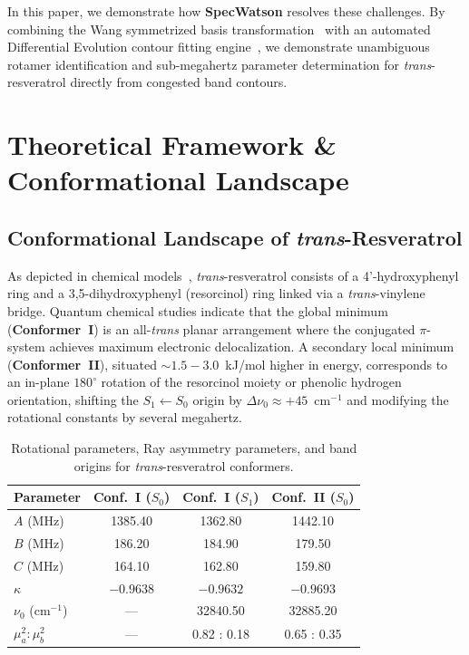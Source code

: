 \documentclass[aps,jcp,reprint,twocolumn,superscriptaddress,showpacs,amsmath,amssymb]{revtex4-2}
\begin{document}
In this paper, we demonstrate how \textbf{SpecWatson} resolves these challenges. By combining the Wang symmetrized basis transformation~\cite{wang1929degree} with an automated Differential Evolution contour fitting engine~\cite{storn1997differential}, we demonstrate unambiguous rotamer identification and sub-megahertz parameter determination for \textit{trans}-resveratrol directly from congested band contours.

\section{Theoretical Framework \& Conformational Landscape}

\subsection{Conformational Landscape of \textit{trans}-Resveratrol}
As depicted in chemical models~\cite{smeyers2004resveratrol}, \textit{trans}-resveratrol consists of a 4'-hydroxyphenyl ring and a 3,5-dihydroxyphenyl (resorcinol) ring linked via a \textit{trans}-vinylene bridge. Quantum chemical studies indicate that the global minimum (\textbf{Conformer~I}) is an all-\textit{trans} planar arrangement where the conjugated $\pi$-system achieves maximum electronic delocalization. A secondary local minimum (\textbf{Conformer~II}), situated $\sim 1.5 - 3.0$~kJ/mol higher in energy, corresponds to an in-plane $180^\circ$ rotation of the resorcinol moiety or phenolic hydrogen orientation, shifting the $S_1 \leftarrow S_0$ origin by $\Delta \nu_0 \approx +45$~cm$^{-1}$ and modifying the rotational constants by several megahertz.

\begin{table}[h]
\caption{Rotational parameters, Ray asymmetry parameters, and band origins for \textit{trans}-resveratrol conformers.}
\label{tab:resveratrol_constants}
\centering
\begin{tabular}{lccc}
\toprule
Parameter & Conf.~I ($S_0$) & Conf.~I ($S_1$) & Conf.~II ($S_0$) \\
\midrule
$A$ (MHz) & 1385.40 & 1362.80 & 1442.10 \\
$B$ (MHz) & 186.20  & 184.90  & 179.50 \\
$C$ (MHz) & 164.10  & 162.80  & 159.80 \\
$\kappa$  & $-0.9638$ & $-0.9632$ & $-0.9693$ \\
$\nu_0$ (cm$^{-1}$) & --- & 32840.50 & 32885.20 \\
$\mu_a^2 : \mu_b^2$ & --- & 0.82 : 0.18 & 0.65 : 0.35 \\
\bottomrule
\end{tabular}
\end{table}
\end{document}
